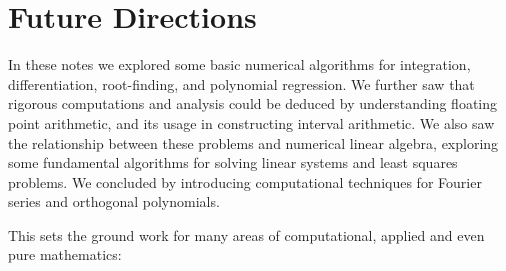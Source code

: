 \documentclass[12pt,a4paper]{book}
\theoremstyle{definition}
\begin{document}

% 
% 


\chapter{Future Directions}

In these notes we explored some basic numerical algorithms for integration, differentiation, root-finding, and
polynomial regression.
We further saw that rigorous computations and analysis could be deduced by understanding floating point arithmetic, and its usage in
constructing interval arithmetic.
We also saw the relationship between these problems and numerical linear algebra, exploring some fundamental algorithms for solving linear
systems and least squares problems.  We concluded by introducing computational techniques for Fourier series and orthogonal polynomials.


This sets the ground work for many areas of computational, applied and even pure mathematics:
\end{document}
